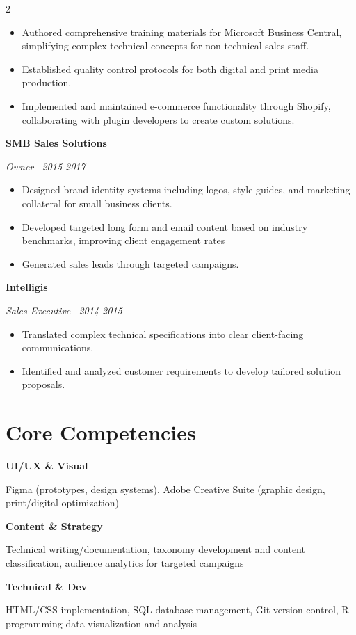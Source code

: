 \documentclass[10pt,letterpaper]{article}
\newcommand{\jobtitle}[3]{%
  {\sffamily\bfseries #1}\par\vspace{-0.4em}
  {\small\color{accent}\itshape #2 \textbar\ #3}\par\vspace{0.2em}
}
\newcommand{\competency}[2]{%
  {\sffamily\bfseries #1}\par\vspace{-0.2em}
  {\small #2}\par\vspace{0.4em}
}
\begin{document}
\begin{paracol}{2}
\begin{itemize}[leftmargin=1.5em, itemsep=0.2em, parsep=0em, topsep=0em]
  \item Authored comprehensive training materials for Microsoft Business Central, simplifying complex technical concepts for non-technical sales staff.
  \item Established quality control protocols for both digital and print media production.
  \item Implemented and maintained e-commerce functionality through Shopify, collaborating with plugin developers to create custom solutions.
\end{itemize}
\vspace{0.5em}
\jobtitle{SMB Sales Solutions}{Owner}{2015-2017}
\begin{itemize}[leftmargin=1.5em, itemsep=0.2em, parsep=0em, topsep=0em]
  \item Designed brand identity systems including logos, style guides, and marketing collateral for small business clients.
  \item Developed targeted long form and email content based on industry benchmarks, improving client engagement rates
  \item Generated sales leads through targeted campaigns.
\end{itemize}
\vspace{0.5em}
\jobtitle{Intelligis}{Sales Executive}{2014-2015}
\begin{itemize}[leftmargin=1.5em, itemsep=0.2em, parsep=0em, topsep=0em]
  \item Translated complex technical specifications into clear client-facing communications.
  \item Identified and analyzed customer requirements to develop tailored solution proposals.
\end{itemize}
\vspace{0.3em}{\itshape Additional: Language Arts/ESL Instructor (various, 2007–2014)}\par
\vspace{0.5em}


\end{paracol}

\newpage

\section{Core Competencies}
\competency{UI/UX \& Visual}{Figma (prototypes, design systems), Adobe Creative Suite (graphic design, print/digital optimization)}
\competency{Content \& Strategy}{Technical writing/documentation, taxonomy development and content classification, audience analytics for targeted campaigns}
\competency{Technical \& Dev}{HTML/CSS implementation, SQL database management, Git version control, R programming data visualization and analysis}
\end{document}
